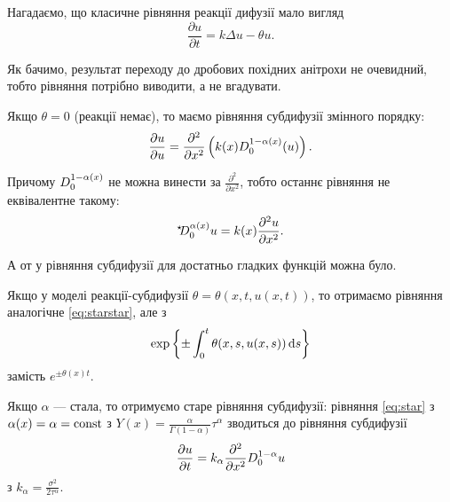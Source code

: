 \begin{remark}
    Нагадаємо, що класичне рівняння реакції дифузії мало вигляд
    \begin{equation}
        \frac{\partial u}{\partial t} = k \Delta u - \theta u.
    \end{equation}
    
    Як бачимо, результат переходу до дробових похідних анітрохи не очевидний, тобто рівняння потрібно виводити, а не вгадувати.
\end{remark}

Якщо $\theta = 0$ (реакції немає), то маємо рівняння субдифузії змінного порядку:
\begin{equation}
    \label{eq:star}
    \frac{\partial u}{\partial u} = \frac{\partial^2}{\partial x^2} \left( k(x) D_0^{1 - \alpha(x)}(u) \right).
\end{equation}

\begin{remark}
    Причому $D_0^{1 - \alpha(x)}$ не можна винести за $\frac{\partial^2}{\partial x^2}$, тобто останнє рівняння не еквівалентне такому:
    \begin{equation}
        {}^{\star\!\!}D_0^{\alpha(x)} u = k(x) \frac{\partial^2 u}{\partial x^2}.
    \end{equation}
    
    А от у рівняння субдифузії для достатньо гладких функцій можна було.
\end{remark}

\begin{remark}
    Якщо у моделі реакції-субдифузії $\theta = \theta(x, t, u(x, t))$, то отримаємо рівняння аналогічне \eqref{eq:starstar}, але з
    \begin{equation}
        \exp\left\{ \pm \int_0^t \theta(x, s, u(x, s)) \mathop{}\!\mathrm{d} s \right\}
    \end{equation}
    замість $e^{\pm \theta(x) t}$.
\end{remark}


\begin{remark}
    Якщо $\alpha$ --- стала, то отримуємо старе рівняння субдифузії: рівняння \eqref{eq:star} з $\alpha(x) = \alpha = \operatorname{const}$ з $Y(x) = \frac{\alpha}{\Gamma(1 - \alpha)} \tau^\alpha$ зводиться до рівняння субдифузії
    \begin{equation}
        \frac{\partial u}{\partial t} = k_\alpha \frac{\partial^2}{\partial x^2} D_0^{1 - \alpha} u     
    \end{equation} 
    з $k_\alpha = \frac{\sigma^2}{2 \tau^\alpha}$.
\end{remark}

